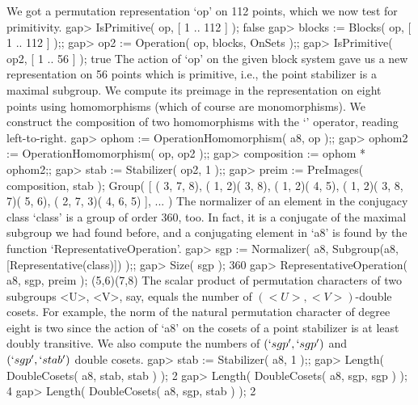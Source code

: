 We got a permutation representation `op' on 112 points, which we now test
for primitivity.
\beginexample
    gap> IsPrimitive( op, [ 1 .. 112 ] );
    false
    gap> blocks := Blocks( op, [ 1 .. 112 ] );;
    gap> op2 := Operation( op, blocks, OnSets );;
    gap> IsPrimitive( op2, [ 1 .. 56 ] );
    true
\endexample
The action of `op' on the given block system gave us a new representation
on 56 points which is primitive, i.e., the  point stabilizer is a maximal
subgroup.  We compute its preimage in  the representation on eight points
using homomorphisms (which of course are monomorphisms). We construct the
composition of   two  homomorphisms  with  the  `\*'   operator,  reading
left-to-right.
\beginexample
    gap> ophom := OperationHomomorphism( a8, op );;
    gap> ophom2 := OperationHomomorphism( op, op2 );;
    gap> composition := ophom * ophom2;;
    gap> stab := Stabilizer( op2, 1 );;
    gap> preim := PreImages( composition, stab );
    Group( [ ( 3, 7, 8), ( 1, 2)( 3, 8), ( 1, 2)( 4, 5), ( 1, 2)( 3, 8, 7)( 5, 6),
      ( 2, 7, 3)( 4, 6, 5) ], ... )
\endexample
The normalizer of an element in the conjugacy class `class' is a group of
order 360, too. In fact, it is a conjugate of the maximal subgroup we had
found before, and a conjugating element in `a8'  is found by the function
`RepresentativeOperation'.
\beginexample
    gap> sgp := Normalizer( a8, Subgroup(a8,[Representative(class)]) );;
    gap> Size( sgp );
    360
    gap> RepresentativeOperation( a8, sgp, preim );
    (5,6)(7,8)
\endexample
The scalar product  of permutation characters  of two subgroups <U>, <V>,
say, equals  the number  of $(<U>,<V>)$-double  cosets. For example,  the
norm of  the natural permutation character of  degree  eight is two since
the action of `a8' on the cosets of a point stabilizer is at least doubly
transitive. We   also   compute  the   numbers  of    $(`sgp',`sgp')$ and
$(`sgp',`stab')$ double cosets.
\beginexample
    gap> stab := Stabilizer( a8, 1 );;
    gap> Length( DoubleCosets( a8, stab, stab ) );
    2
    gap> Length( DoubleCosets( a8, sgp, sgp ) );
    4
    gap> Length( DoubleCosets( a8, sgp, stab ) );
    2
\endexample

